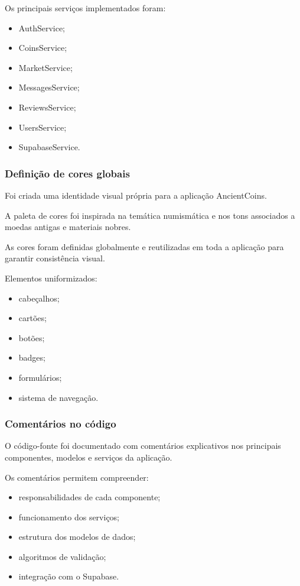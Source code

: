 \documentclass[12pt,a4paper]{article}
\begin{document}
Os principais serviços implementados foram:

\begin{itemize}
\setlength{\itemsep}{0.15em}
\item AuthService;
\item CoinsService;
\item MarketService;
\item MessagesService;
\item ReviewsService;
\item UsersService;
\item SupabaseService.
\end{itemize}

\subsubsection{Definição de cores globais}

Foi criada uma identidade visual própria para a aplicação AncientCoins.

A paleta de cores foi inspirada na temática numismática e nos tons associados a moedas antigas e materiais nobres.

As cores foram definidas globalmente e reutilizadas em toda a aplicação para garantir consistência visual.

Elementos uniformizados:

\begin{itemize}
\setlength{\itemsep}{0.15em}
\item cabeçalhos;
\item cartões;
\item botões;
\item badges;
\item formulários;
\item sistema de navegação.
\end{itemize}

\subsubsection{Comentários no código}

O código-fonte foi documentado com comentários explicativos nos principais componentes, modelos e serviços da aplicação.

Os comentários permitem compreender:

\begin{itemize}
\setlength{\itemsep}{0.15em}
\item responsabilidades de cada componente;
\item funcionamento dos serviços;
\item estrutura dos modelos de dados;
\item algoritmos de validação;
\item integração com o Supabase.
\end{itemize}
\end{document}
